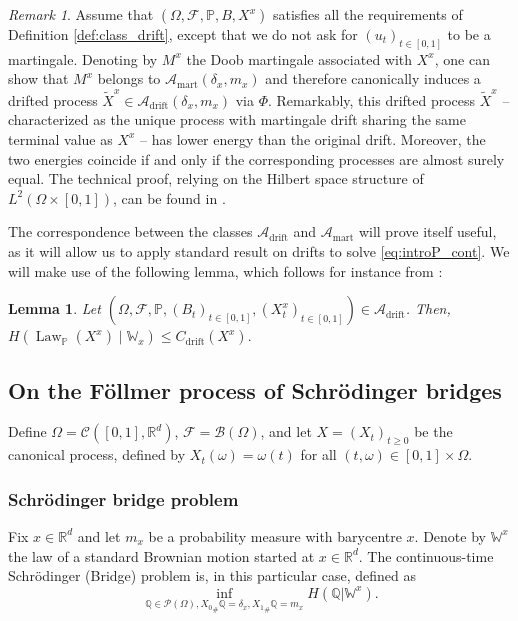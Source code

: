 \documentclass[reqno, a4paper]{amsart}
\theoremstyle{plain}
\newtheorem{lemma}[theorem]{Lemma}
\theoremstyle{definition}
\theoremstyle{remark}
\newtheorem{remark}[theorem]{Remark}
\numberwithin{equation}{section}
\numberwithin{theorem}{section}
\newcommand{\R}{\mathbb{R}}
\newcommand{\Law}{\operatorname{Law}}
\newcommand{\PP}{\mathcal{P}}
\begin{document}
	\begin{remark}\label{remq:drift_to_martingale_drift}
		Assume that $(\Omega, \mathcal F, \mathbb P, B, X^x)$ satisfies all the requirements of Definition \ref{def:class_drift}, except that we do not ask for $(u_t)_{t \in [0,1]}$ to be a martingale. Denoting by $M^x$ the Doob martingale associated with $X^x$, one can show that $M^x$ belongs to $\mathcal A_{\mathrm{mart}}(\delta_x,m_x)$ and therefore canonically induces a drifted process $\tilde X^x \in \mathcal A_{\mathrm{drift}}(\delta_x,m_x)$ via $\Phi$.	Remarkably, this drifted process $\tilde X^x$ -- characterized as the unique process with martingale drift sharing the same terminal value as $X^x$ -- has lower energy than the original drift. Moreover, the two energies coincide if and only if the corresponding processes are almost surely equal. The technical proof, relying on the Hilbert space structure of $L^2(\Omega \times [0,1])$, can be found in \cite[Appendix B]{BaBeBiLe26v1}.
	\end{remark}
	
	The correspondence between the classes $\mathcal{A}_{\mathrm{drift}}$ and $\mathcal{A}_{\mathrm{mart}}$ will prove itself useful, as it will allow us to apply standard result on  drifts to solve \eqref{eq:introP_cont}. We will make use of the following lemma, which follows for instance from  \cite[Proposition 1]{Le13}:
	
	\begin{lemma}\label{lem:energy_entropy_bound}
		Let $\left(\Omega,\mathcal F,\mathbb P,(B_t)_{t \in [0,1]},(X_t^x)_{t \in [0,1]}\right)\in \mathcal{A}_{\mathrm{drift}}$. Then, $H(\Law_\mathbb{P}(X^x)\mid \mathbb{W}_x) \le C_{\mathrm{drift}}(X^x).$
	\end{lemma}
	
	
	\subsection{On the Föllmer process of Schrödinger bridges}
	Define
	$\Omega = \mathcal{C}([0,1],\R^d)$, $\mathcal{F} = \mathcal{B}(\Omega)$, and let $X = (X_t)_{t \geq 0}$ be the canonical process, defined by $X_t(\omega) = \omega(t)$ for all $(t,\omega) \in [0,1] \times \Omega$.
	
	\subsubsection{Schrödinger bridge problem}
	Fix $x \in \R^d$ and let $m_x$ be a probability measure with barycentre $x$. Denote by $\mathbb{W}^x$ the law of a standard Brownian motion started at $x \in \R^d$. The continuous-time Schrödinger (Bridge) problem is, in this particular case, defined as  
	\begin{equation}\label{eq:SB}
		\inf_{\mathbb{Q} \in \PP(\Omega),{X_0}_\# \mathbb{Q} = \delta_x, {X_1}_\# \mathbb{Q} = m_x} H(\mathbb{Q}|\mathbb{W}^x).\tag{SB}
	\end{equation}
	
\end{document}
